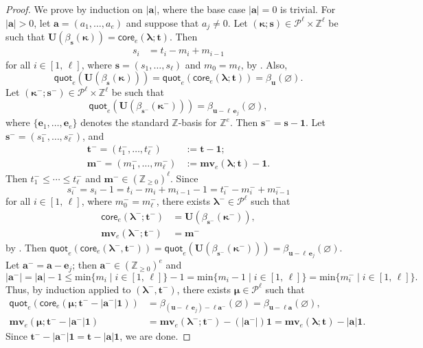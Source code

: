 \documentclass[11pt,a4paper,reqno]{amsart}
\numberwithin{equation}{section}
\theoremstyle{plain}
\theoremstyle{definition}
\theoremstyle{remark}
\numberwithin{equation}{section}
\newcommand{\bone}{\boldsymbol{1}}
\newcommand{\bl}{\boldsymbol{\lambda}}
\newcommand{\bm}{\boldsymbol{\mu}}
\newcommand{\UU}{\mathbf{U}}
\newcommand{\ba}{\mathbf{a}}
\newcommand{\bs}{\mathbf{s}}
\newcommand{\bt}{\mathbf{t}}
\newcommand{\bu}{\mathbf{u}}
\newcommand{\core}{\mathsf{core}}
\newcommand{\quot}{\mathsf{quot}}
\newcommand{\mv}{\mathbf{mv}}
\renewcommand{\min}{\mathrm{min}}
\newcommand{\ZZ}{\mathbb{Z}}
\newcommand{\PP}{\mathcal{P}}
\newcommand{\Be}{\mathbf{e}}
\newcommand{\EP}{\pmb{\varnothing}}
\begin{document}
\begin{proof}
We prove by induction on $|\ba|$, where the base case $|\ba| =0$ is trivial.  
For $|\ba| >0$, let $\ba = (a_1,\dotsc, a_e)$ and suppose that $a_j \ne 0$.
Let $(\boldsymbol{\kappa};\bs) \in \PP^{\ell} \times \ZZ^{\ell}$ be such that $\UU(\beta_{\bs}(\boldsymbol{\kappa})) = \core_e(\bl;\bt)$.
Then 
\begin{align*}
s_i &= t_i - m_i + m_{i-1}
\end{align*}
for all $i \in [1,\,\ell]$, where $\bs = (s_1,\dotsc, s_{\ell})$ and $m_0 = m_{\ell}$, by \cite[Corollary 3.5]{LQT}.
Also,
$$ \quot_e(\UU(\beta_{\bs}(\boldsymbol{\kappa}))) = \quot_e(\core_e(\bl;\bt)) = \beta_{\bu}(\EP).$$ %
Let $(\boldsymbol{\kappa}^-; \bs^-) \in \PP^{\ell} \times \ZZ^{\ell}$ be such that
$$
\quot_e(\UU(\beta_{\bs^-}(\boldsymbol{\kappa}^-))) = \beta_{\bu - \ell\,\Be_j}(\EP),
$$
where $\{ \Be_1,\dotsc, \Be_e \}$ denotes the standard $\ZZ$-basis for $\ZZ^e$.
Then $\bs^- = \bs - \bone$.  
Let $\bs^- = (s^-_1,\dotsc, s^-_{\ell})$, and 
\begin{align*}
\bt^{-} = (t^-_1,\dotsc, t^-_{\ell}) &:= \bt - \bone; \\
\mathbf{m}^- = (m^-_1,\dotsc, m^-_{\ell}) &:= \mv_e(\bl;\bt) - \bone.
\end{align*}
Then $t^-_1 \leq \dotsb \leq t^-_{\ell}$ and $\mathbf{m}^- \in (\ZZ_{\geq 0})^{\ell}$.
Since
$$
s^-_i = s_i - 1 = t_i - m_i + m_{i-1} - 1 = t^-_i - m^-_i + m^-_{i-1}$$
for all $i \in [1,\, \ell]$, where $m^-_0 = m^-_{\ell}$,
there exists $\bl^- \in \PP^{\ell}$ such that 
\begin{align*}
\core_e(\bl^-;\bt^-) &= \UU(\beta_{\bs^-}(\boldsymbol{\kappa}^-)), \\
\mv_e(\bl^-;\bt^-) &= \mathbf{m}^-
\end{align*} by \cite[Corollary 3.8]{LQT}.
Then $\quot_e(\core_e(\bl^-,\bt^-)) = \quot_e(\UU(\beta_{\bs^-}(\boldsymbol{\kappa}^-))) = \beta_{\bu-\ell\, \Be_j}(\EP)$.
Let $\ba^- = \ba - \Be_j$; then $\ba^- \in (\ZZ_{\geq 0})^{e}$ and $$|\ba^-| = |\ba| - 1 \leq \min\{ m_i \mid i \in [1,\, \ell] \} - 1 = \min\{ m_i -1\mid i \in [1,\, \ell] \} = \min\{ m^-_i \mid i \in [1,\, \ell] \}.$$ 
Thus, by induction applied to $(\bl^-,\bt^-)$, there exists $\bm \in \PP^{\ell}$ such that 
\begin{align*}
\quot_e(\core_e(\bm;\bt^- - |\ba^-|\bone)) &= \beta_{(\bu - \ell\, \Be_j) - \ell\ba^-}(\EP) = \beta_{\bu - \ell\ba}(\EP), \\
\mv_e(\bm;\bt^- - |\ba^-|\bone) &= \mv_e(\bl^-;\bt^-) - (|\ba^-|)\bone = \mv_e(\bl;\bt) - |\ba|\bone.
\end{align*}
Since $\bt^- - |\ba^-| \bone = \bt - |\ba|\bone$, we are done.
\end{proof}
\end{document}
